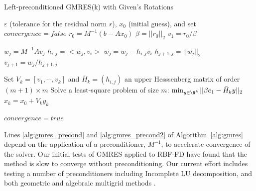 \begin{algorithm}                      %
\caption{Left-preconditioned GMRES(k) with Given's Rotations}          %
\label{alg:gmres}                           %
\begin{algorithmic}[1]                    %
    \State $\varepsilon$ (tolerance for the residual norm $r$), $x_0$ (initial guess), and set $convergence = false$
    \State $r_0 = M^{-1} (b-Ax_0)$ \label{alg:gmres_precond}
    \State $\beta = ||r_0||_2$			
    \State $v_1 = r_0 / \beta$ 

			\State $w_j = M^{-1} A v_j$  \label{alg:gmres_precond2} 
				\State $h_{i,j} = <w_j, v_i>$ 
				\State $w_j = w_j - h_{i,j} v_i$
			\EndFor %
			\State $h_{j+1, j}  = ||w_j||_2$		
			\State $v_{j+1} = w_j / h_{j+1,j}$		
	\EndFor %

			\State Set $V_k = [v_1, \cdots, v_k]$ and $\bar{H}_k = (h_{i,j})$ an upper Hesssenberg matrix of order $(m+1)\times m$
			\State Solve a least-square problem of size $m$: $\min_{y \in \R^k} ||\beta e_1 - \bar{H}_k y||_2$ %
			\State $x_k = x_0 + V_k y_k$ %

		\State $convergence = true$
	\EndIf
    \EndWhile
\end{algorithmic}
\end{algorithm}

Lines \ref{alg:gmres_precond} and \ref{alg:gmres_precond2} of Algorithm~\ref{alg:gmres} depend on the application of a preconditioner, $M^{-1}$, to accelerate convergence of the solver. Our initial tests of GMRES applied to RBF-FD have found that the method is slow to converge without preconditioning. Our current effort includes testing a number of preconditioners including Incomplete LU decomposition, and both geometric and algebraic multigrid methods \cite{Saad2003}.
%
%
%


